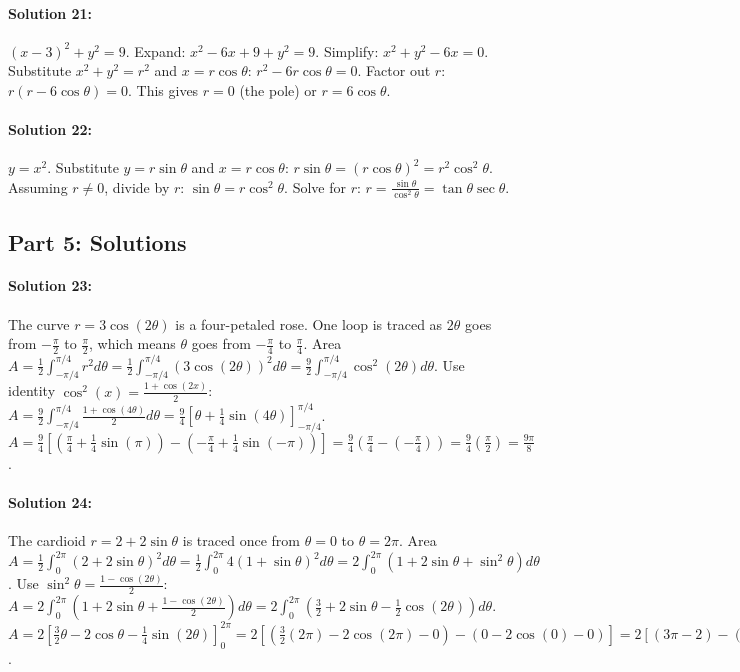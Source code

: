 \documentclass{article}
\begin{document}
\paragraph{Solution 21:} $(x-3)^2 + y^2 = 9$. Expand: $x^2 - 6x + 9 + y^2 = 9$. Simplify: $x^2 + y^2 - 6x = 0$. Substitute $x^2+y^2=r^2$ and $x=r\cos\theta$: $r^2 - 6r\cos\theta = 0$. Factor out $r$: $r(r - 6\cos\theta) = 0$. This gives $r=0$ (the pole) or $r = 6\cos\theta$.

\paragraph{Solution 22:} $y = x^2$. Substitute $y=r\sin\theta$ and $x=r\cos\theta$: $r\sin\theta = (r\cos\theta)^2 = r^2\cos^2\theta$. Assuming $r \neq 0$, divide by $r$: $\sin\theta = r\cos^2\theta$. Solve for $r$: $r = \frac{\sin\theta}{\cos^2\theta} = \tan\theta\sec\theta$.

\subsection*{Part 5: Solutions}
\paragraph{Solution 23:} The curve $r = 3\cos(2\theta)$ is a four-petaled rose. One loop is traced as $2\theta$ goes from $-\frac{\pi}{2}$ to $\frac{\pi}{2}$, which means $\theta$ goes from $-\frac{\pi}{4}$ to $\frac{\pi}{4}$.
Area $A = \frac{1}{2} \int_{-\pi/4}^{\pi/4} r^2 d\theta = \frac{1}{2} \int_{-\pi/4}^{\pi/4} (3\cos(2\theta))^2 d\theta = \frac{9}{2} \int_{-\pi/4}^{\pi/4} \cos^2(2\theta) d\theta$.
Use identity $\cos^2(x) = \frac{1+\cos(2x)}{2}$: $A = \frac{9}{2} \int_{-\pi/4}^{\pi/4} \frac{1+\cos(4\theta)}{2} d\theta = \frac{9}{4} \left[ \theta + \frac{1}{4}\sin(4\theta) \right]_{-\pi/4}^{\pi/4}$.
$A = \frac{9}{4} \left[ (\frac{\pi}{4} + \frac{1}{4}\sin(\pi)) - (-\frac{\pi}{4} + \frac{1}{4}\sin(-\pi)) \right] = \frac{9}{4} (\frac{\pi}{4} - (-\frac{\pi}{4})) = \frac{9}{4}(\frac{\pi}{2}) = \frac{9\pi}{8}$.

\paragraph{Solution 24:} The cardioid $r = 2 + 2\sin\theta$ is traced once from $\theta=0$ to $\theta=2\pi$.
Area $A = \frac{1}{2} \int_{0}^{2\pi} (2+2\sin\theta)^2 d\theta = \frac{1}{2} \int_{0}^{2\pi} 4(1+\sin\theta)^2 d\theta = 2 \int_{0}^{2\pi} (1+2\sin\theta+\sin^2\theta) d\theta$.
Use $\sin^2\theta = \frac{1-\cos(2\theta)}{2}$: $A = 2 \int_{0}^{2\pi} (1+2\sin\theta+\frac{1-\cos(2\theta)}{2}) d\theta = 2 \int_{0}^{2\pi} (\frac{3}{2}+2\sin\theta-\frac{1}{2}\cos(2\theta)) d\theta$.
$A = 2 \left[ \frac{3}{2}\theta - 2\cos\theta - \frac{1}{4}\sin(2\theta) \right]_{0}^{2\pi} = 2 [(\frac{3}{2}(2\pi)-2\cos(2\pi)-0) - (0-2\cos(0)-0)] = 2[(3\pi-2)-(-2)] = 6\pi$.
\end{document}
